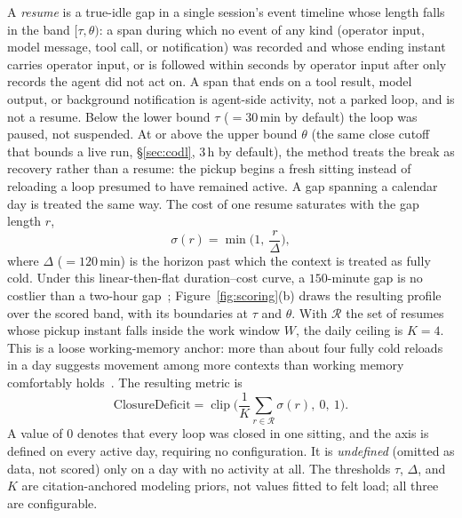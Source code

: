 \documentclass[10pt,twocolumn]{article}
\begin{document}
A \emph{resume} is a true-idle gap in a single session's event timeline whose
length falls in the band $[\tau,\theta)$: a span during which no event of any kind
(operator input, model message, tool call, or notification) was recorded and
whose ending instant carries operator input, or is followed within seconds by
operator input after only records the agent did not act on. A span that ends on a tool result,
model output, or background notification is agent-side activity, not a parked
loop, and is not a resume. Below the lower bound
$\tau$ ($=30$\,min by default) the loop was paused, not suspended. At or above
the upper bound $\theta$ (the same close cutoff that bounds a live run,
\S\ref{sec:codl}, $3$\,h by default), the method treats the break as recovery
rather than a resume: the pickup begins a fresh sitting instead of reloading a
loop presumed to have remained active. A gap spanning a calendar day is treated
the same way. The cost of one resume saturates with the gap length $r$,
\begin{equation}
\sigma(r) = \min\!\Big(1,\ \frac{r}{\Delta}\Big),
\end{equation}
where $\Delta$ ($=120$\,min) is the horizon past which the context is treated as
fully cold. Under this linear-then-flat duration--cost curve, a $150$-minute gap
is no costlier than a two-hour gap~\cite{monk2008,altmann2002};
Figure~\ref{fig:scoring}(b) draws the resulting profile over the scored band,
with its boundaries at $\tau$ and $\theta$. With
$\mathcal{R}$ the set of resumes whose pickup instant falls inside the work
window $W$, the daily ceiling is $K=4$. This is a loose working-memory anchor:
more than about four fully cold reloads in a day suggests movement among more
contexts than working memory comfortably holds~\cite{cowan2001}. The resulting
metric is
\begin{equation}
\mathrm{ClosureDeficit} =
\operatorname{clip}\!\Big(\frac{1}{K}\sum_{r\in\mathcal{R}}\sigma(r),\ 0,\ 1\Big).
\end{equation}
A value of $0$ denotes that every loop was closed in one sitting, and
the axis is defined on every active day, requiring no configuration. It is
\emph{undefined} (omitted as data, not scored) only on a day
with no activity at all. The thresholds $\tau$, $\Delta$, and $K$ are
citation-anchored modeling priors, not values fitted to felt load; all three are
configurable.
\end{document}
